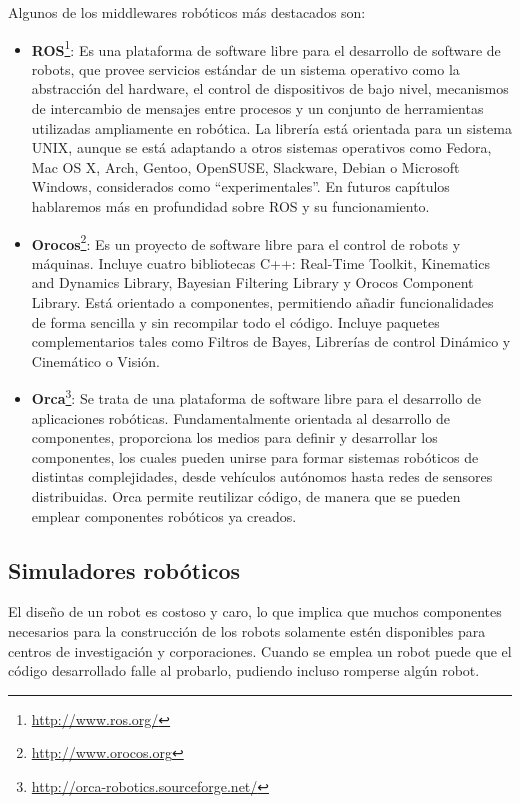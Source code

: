 Algunos de los middlewares robóticos más destacados son:

\begin{itemize}
\item \textbf{ROS}\footnote{\url{http://www.ros.org/}}: Es una plataforma de software libre para el desarrollo de software de robots, que provee servicios estándar de un sistema operativo como la abstracción del hardware, el control de dispositivos de bajo nivel, mecanismos de intercambio de mensajes entre procesos y un conjunto de herramientas utilizadas ampliamente en robótica. La librería está orientada para un sistema UNIX, aunque se está adaptando a otros sistemas operativos como Fedora, Mac OS X, Arch, Gentoo, OpenSUSE, Slackware, Debian o Microsoft Windows, considerados como ``experimentales''.
En futuros capítulos hablaremos más en profundidad sobre ROS y su funcionamiento.
\item \textbf{Orocos}\footnote{\url{http://www.orocos.org}}: Es un proyecto de software libre para el control de robots y máquinas. Incluye cuatro bibliotecas C++: Real-Time Toolkit, Kinematics and Dynamics Library,  Bayesian Filtering Library y  Orocos Component Library. Está orientado a componentes, permitiendo añadir funcionalidades de forma sencilla y sin recompilar todo el código.  Incluye paquetes complementarios tales como Filtros de Bayes, Librerías de control Dinámico y Cinemático o Visión.

\item \textbf{Orca}\footnote{\url{http://orca-robotics.sourceforge.net/}}: Se trata de una plataforma de software libre para el desarrollo de aplicaciones robóticas. Fundamentalmente orientada al desarrollo de componentes, proporciona los medios para definir y desarrollar los componentes, los cuales pueden unirse para formar sistemas robóticos de distintas complejidades, desde vehículos autónomos hasta redes de sensores distribuidas.
Orca permite reutilizar código, de manera que se pueden emplear componentes robóticos ya creados.
\end{itemize}

\subsection{Simuladores robóticos}
El diseño de un robot es costoso y caro, lo que implica que muchos componentes necesarios para la construcción de los robots solamente estén disponibles para centros de investigación y corporaciones. Cuando se emplea un robot puede que el código desarrollado falle al probarlo, pudiendo incluso romperse algún robot.\\


